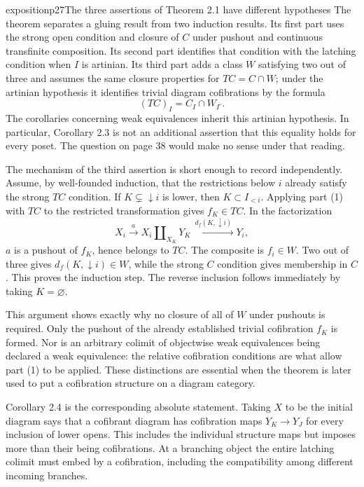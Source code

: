 \begin{dcomment}{exposition}{p27}{The three assertions of Theorem 2.1 have different hypotheses}
The theorem separates a gluing result from two induction results. Its first part uses the strong open condition and closure of $C$ under pushout and continuous transfinite composition. Its second part identifies that condition with the latching condition when $I$ is artinian. Its third part adds a class $W$ satisfying two out of three and assumes the same closure properties for $TC=C\cap W$; under the artinian hypothesis it identifies trivial diagram cofibrations by the formula
\[
 (TC)_I=C_I\cap W_{I^\circ}.
\]
The corollaries concerning weak equivalences inherit this artinian hypothesis. In particular, Corollary 2.3 is not an additional assertion that this equality holds for every poset. The question on page 38 would make no sense under that reading.

The mechanism of the third assertion is short enough to record independently. Assume, by well-founded induction, that the restrictions below $i$ already satisfy the strong $TC$ condition. If $K\subsetneq\downarrow i$ is lower, then $K\subset I_{<i}$. Applying part (1) with $TC$ to the restricted transformation gives $f_K\in TC$. In the factorization
\[
 X_i\xrightarrow{\ a\ }X_i\amalg_{X_K}Y_K
       \xrightarrow{\ d_f(K,\downarrow i)\ }Y_i,
\]
$a$ is a pushout of $f_K$, hence belongs to $TC$. The composite is $f_i\in W$. Two out of three gives $d_f(K,\downarrow i)\in W$, while the strong $C$ condition gives membership in $C$. This proves the induction step. The reverse inclusion follows immediately by taking $K=\varnothing$.

This argument shows exactly why no closure of all of $W$ under pushouts is required. Only the pushout of the already established trivial cofibration $f_K$ is formed. Nor is an arbitrary colimit of objectwise weak equivalences being declared a weak equivalence: the relative cofibration conditions are what allow part (1) to be applied. These distinctions are essential when the theorem is later used to put a cofibration structure on a diagram category.

Corollary 2.4 is the corresponding absolute statement. Taking $X$ to be the initial diagram says that a cofibrant diagram has cofibration maps $Y_K\to Y_J$ for every inclusion of lower opens. This includes the individual structure maps but imposes more than their being cofibrations. At a branching object the entire latching colimit must embed by a cofibration, including the compatibility among different incoming branches.
\end{dcomment}

